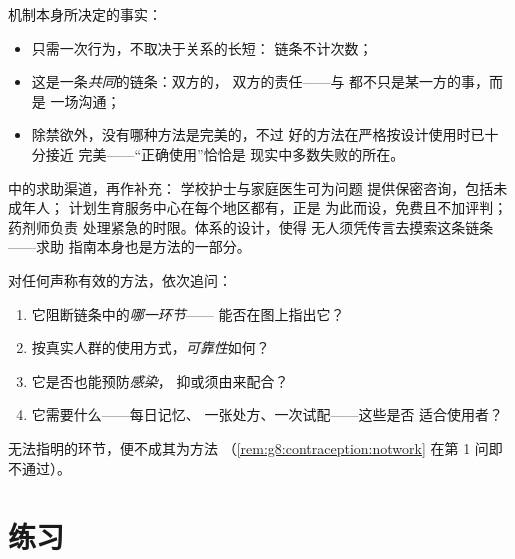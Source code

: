 \begin{proposition}\label{prop:g8:contraception:choice}
机制本身所决定的事实：
\begin{itemize}
  \item {}只需一次行为，不取决于关系的长短：
        链条不计次数；
  \item 这是一条\emph{共同}的链条：双方的，
        双方的责任——与
        都不只是某一方的事，而是
        一场沟通；
  \item 除禁欲外，没有哪种方法是完美的，不过
        好的方法在严格按设计使用时已十分接近
        完美——“正确使用”恰恰是
        现实中多数失败的所在。
\end{itemize}
\end{proposition}
\admitted

\begin{example}[求助指南]\label{ex:g8:contraception:help}
中的求助渠道，再作补充：
学校护士与家庭医生可为问题
提供保密咨询，包括未成年人；
计划生育服务中心在每个地区都有，正是
为此而设，免费且不加评判；药剂师负责
处理紧急的时限。体系的设计，使得
无人须凭传言去摸索这条链条——求助
指南本身也是方法的一部分。
\end{example}

\begin{method}[评估你听说的任何方法]\label{met:g8:contraception:evaluate}
对任何声称有效的方法，依次追问：
\begin{enumerate}
  \item 它阻断链条中的\emph{哪一环节}——
        能否在图上指出它？
  \item 按真实人群的使用方式，\emph{可靠性}如何？
  \item 它是否也能预防\emph{感染}，
        抑或须由来配合？
  \item 它需要什么——每日记忆、
        一张处方、一次试配——这些是否
        适合使用者？
\end{enumerate}
无法指明的环节，便不成其为方法
（\cref{rem:g8:contraception:notwork}
在第 1 问即不通过）。
\end{method}

\section{练习}

